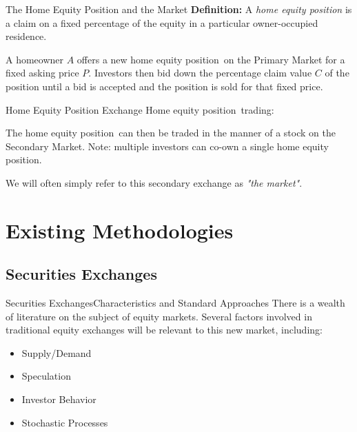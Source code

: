 \documentclass{beamer}
\newcommand{\hep}{home equity position}
\newcommand{\Hep}{Home equity position}
\begin{document}
\begin{frame}{The Home Equity Position and the Market}{}
\textbf{Definition:} A \emph{home equity position} is a claim on a fixed percentage of the equity in a particular owner-occupied residence.\bigskip

A homeowner $A$ offers a new \hep\ on the Primary Market for a fixed asking price $P$. Investors then bid down the percentage claim value $C$ of the position until a bid is accepted and the position is sold for that fixed price.

\end{frame}
\begin{frame}{Home Equity Position Exchange}
\Hep\ trading:


The \hep\ can then be traded in the manner of a stock on the Secondary Market. Note: multiple investors can co-own a single \hep.

We will often simply refer to this secondary exchange as \emph{"the market"}.
\end{frame}








\section{Existing Methodologies}

\subsection{Securities Exchanges}
\begin{frame}{Securities Exchanges}{Characteristics and Standard Approaches}
There is a wealth of literature on the subject of equity markets. Several factors involved in traditional equity exchanges will be relevant to this new market, including:
\begin{itemize}
\item
Supply/Demand
\item
Speculation
\item
Investor Behavior
\item
Stochastic Processes
\end{itemize}
\end{frame}
\end{document}
